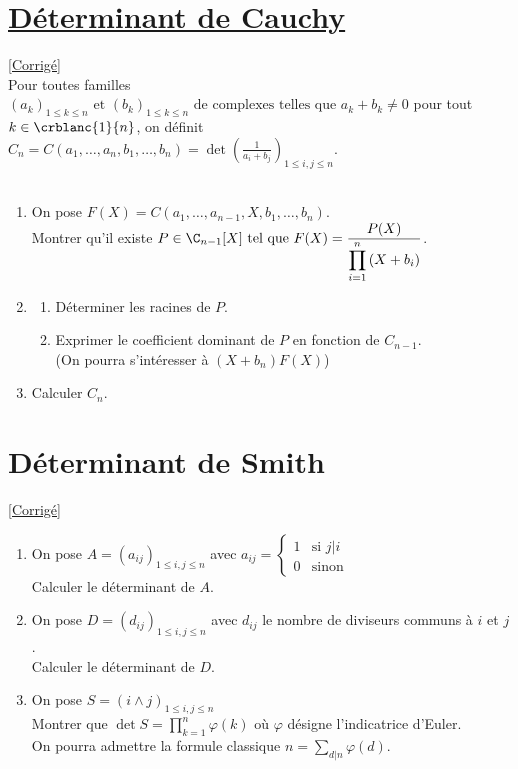 \documentclass[8pt]{book}
\begin{document}
	\section{\underline{Déterminant de Cauchy}}
	\label{Déterminant de Cauchy}
	\textcolor{blue}{\hyperref[Déterminant de Cauchy corrigé]{[Corrigé]}}\\
	Pour toutes familles $(a_k)_{1\leq k\leq n} \text{ et } (b_k)_{1\leq k\leq n} \text{ de complexes telles que } a_k+b_k\ne 0$ pour tout $k \in \crblanc{1}{n}$, on définit $C_n=C(a_1,\dots,a_n,b_1,\dots,b_n)=\displaystyle\det{\left(\frac{1}{a_i+b_j}\right)_{1\leq i,j\leq n}}$.\\\\
	\begin{enumerate}[leftmargin=*]
		\item On pose $F(X)=C(a_1,\dots,a_{n-1},X,b_1,\dots,b_n)$.\\
		Montrer qu'il existe $P\in \C_{n-1}[X] \text{ tel que } F(X)=\displaystyle\frac{P(X)}{\displaystyle\prod\limits_{i=1}^{n}{(X+b_i)}}$.\\
		\item \begin{enumerate}[label=\alph*.]
			\item Déterminer les racines de $P$.
			\item Exprimer le coefficient dominant de $P$ en fonction de $C_{n-1}$. 
			\\(On pourra s'intéresser à $(X+b_n)F(X)$)
		\end{enumerate} 
		\item Calculer $C_n$.
	\end{enumerate}
	
	\section{Déterminant de Smith}
	\label{Déterminant de Smith}
	\textcolor{blue}{\hyperref[Déterminant de Smith corrigé]{[Corrigé]}}\\
	\begin{enumerate}[leftmargin=*]
		\item On pose $A=(a_{ij})_{1\leq i,j\leq n}$ avec
		$
		a_{ij}=
		\begin{cases}
			1 & \mbox{si } j|i\\
			0 & \mbox{sinon}
		\end{cases}
		$\\
		Calculer le déterminant de $A$.
		\item On pose $D=(d_{ij})_{1\leq i,j\leq n}$ avec $d_{ij}$ le nombre de diviseurs communs à $i$ et $j$.\\
		Calculer le déterminant de $D$.
		\item On pose $S=(i\wedge j)_{1\leq i,j\leq n}$\\
		Montrer que $\det S=\displaystyle\prod_{k=1}^{n}\varphi(k)$ où $\varphi$ désigne l'indicatrice d'Euler.\\
		On pourra admettre la formule classique $n=\displaystyle\sum_{d|n}\varphi(d)$.
	\end{enumerate}
	
\end{document}
